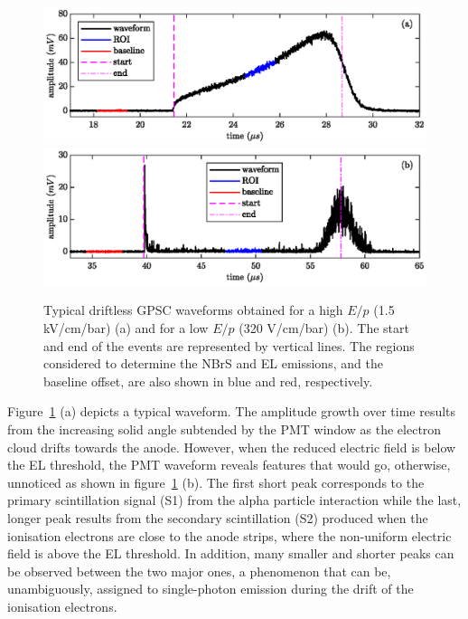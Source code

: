 \documentclass[%
 reprint,
superscriptaddress,
 amsmath,amssymb,
 aps,
]{revtex4-2}
\begin{document}
\begin{figure}[tbp]
\centering %
\includegraphics[]{Fig7a.eps}
\includegraphics[]{Fig7b.eps}
\hfill
\caption{\label{fig:waveforms}Typical driftless GPSC waveforms obtained for a high $E/p$ (1.5 kV/cm/bar) (a) and for a low $E/p$ (320 V/cm/bar) (b). The start and end of the events are represented by vertical lines. The regions considered to determine the NBrS and EL emissions, and the baseline offset, are also shown in blue and red, respectively.}
\end{figure}

Figure~\ref{fig:waveforms} (a) depicts a typical waveform. The amplitude growth over time results from the increasing solid angle subtended by the PMT window as the electron cloud drifts towards the anode. However, when the reduced electric field is below the EL threshold, the PMT waveform reveals features that would go, otherwise, unnoticed as shown in figure~\ref{fig:waveforms} (b). The first short peak corresponds to the primary scintillation signal (S1) from the alpha particle interaction while the last, longer peak results from the secondary scintillation (S2) produced when the ionisation electrons are close to the anode strips, where the non-uniform electric field is above the EL threshold. In addition, many smaller and shorter peaks can be observed between the two major ones, a phenomenon that can be, unambiguously, assigned to single-photon emission during the drift of the ionisation electrons. 
\end{document}

